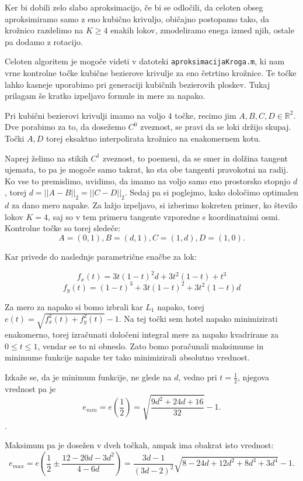 \documentclass[a4paper,11pt]{article}
\begin{document}
	Ker bi dobili zelo slabo aproksimacijo, če bi se odločili, da celoten obseg aproksimiramo samo z eno kubično krivuljo, običajno postopamo tako, da krožnico razdelimo na $K \geq 4$ enakih lokov, zmodeliramo enega izmed njih, ostale pa dodamo z rotacijo.
	
	Celoten algoritem je mogoče videti v datoteki \texttt{aproksimacijaKroga.m}, ki nam vrne kontrolne točke kubične bezierove krivulje za eno četrtino krožnice. Te točke lahko kasneje uporabimo pri generaciji kubičnih bezierovih ploskev. Tukaj prilagam še kratko izpeljavo formule in mere za napako.
	
	Pri kubični bezierovi krivulji imamo na voljo 4 točke, recimo jim $A, B, C, D \in \mathbb{R}^2$. Dve porabimo za to, da dosežemo $C^0$ zveznost, se pravi da se loki držijo skupaj. Točki $A, D$ torej eksaktno interpolirata krožnico na enakomernem kotu.
	
	Naprej želimo na stikih $C^1$ zveznost, to poemeni, da se smer in dolžina tangent ujemata, to pa je mogoče samo takrat, ko sta obe tangenti pravokotni na radij. Ko vse to premislimo, uvidimo, da imamo na voljo samo eno prostorsko stopnjo $d$, torej $d = ||A - B||_2 = ||C - D||_2$. Sedaj pa si poglejmo, kako določimo optimalen $d$ za dano mero napake. Za lažjo izpeljavo, si izberimo kokreten primer, ko število lokov $K = 4$, saj so v tem primeru tangente vzporedne s koordinatnimi osmi. Kontrolne točke so torej sledeče:
	$$
		A = (0, 1),
		B = (d, 1),
		C = (1, d),
		D = (1, 0).
	$$
	
	Kar privede do naslednje parametrične enačbe za lok:
	
	$$
		f_x(t) = 3t(1-t)^2d + 3t^2(1-t)+t^3
	$$
	$$
		f_y(t) = (1-t)^3 + 3t(1-t)^2 + 3t^2(1-t)d
	$$
	
	Za mero za napako si bomo izbrali kar $L_1$ napako, torej $e(t) = \sqrt{f^2_x(t) + f^2_y(t)} - 1$. Na tej točki sem hotel napako minimizirati enakomerno, torej izračunati določeni integral mere za napako kvadrirane za $0 \leq t \leq 1$, vendar se to ni obneslo. Zato bomo poračunali maksimume in minimume funkcije napake ter tako minimizirali absolutno vrednost.
	
	Izkaže se, da je minimum funkcije, ne glede na $d$, vedno pri $t = \frac{1}{2}$, njegova vrednost pa je
	$$
		e_{min} = e\left(\frac{1}{2}\right) = \sqrt{\frac{9 d^2+24 d+16}{32}} - 1.
	$$.
	
	Maksimum pa je dosežen v dveh točkah, ampak ima obakrat isto vrednost:
	$$
		e_{max} = e\left(\frac{1}{2} \pm \frac{12-20d-3d^2}{4-6d}\right) = \frac{3d-1}{(3 d-2)^2}\sqrt{8 - 24 d + 12 d^2 + 8 d^3 + 3 d^4}-1.
	$$
	
\end{document}
